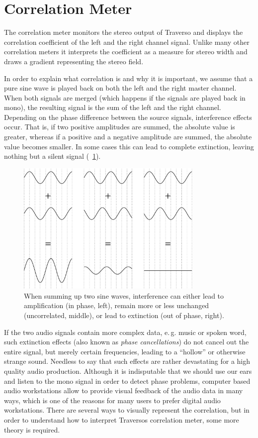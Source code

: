 \section{Correlation Meter}
The correlation meter monitors the stereo output of Traverso and displays the correlation coefficient of the left and the right channel signal. Unlike many other correlation meters it interprets the coefficient as a measure for stereo width and draws a gradient representing the stereo field.

In order to explain what correlation is and why it is important, we assume that a pure sine wave is played back on both the left and the right master channel. When both signals are merged (which happens if the signals are played back in mono), the resulting signal is the sum of the left and the right channel. Depending on the phase difference between the source signals, interference effects occur. That is, if two positive amplitudes are summed, the absolute value is greater, whereas if a positive and a negative amplitude are summed, the absolute value becomes smaller. In some cases this can lead to complete extinction, leaving nothing but a silent signal (\FigB\ \ref{fig_interference}).

\begin{figure}
	\centering\includegraphics[width=0.8\textwidth]{images/sine01}
	\caption{When summing up two sine waves, interference can either lead to amplification (in phase, left), remain more or less unchanged (uncorrelated, middle), or lead to extinction (out of phase, right).}
	\label{fig_interference}
\end{figure}

If the two audio signals contain more complex data, e.\,g. music or spoken word, such extinction effects (also known as \emph{phase cancellations}) do not cancel out the entire signal, but merely certain frequencies, leading to a ``hollow'' or otherwise strange sound. Needless to say that such effects are rather devastating for a high quality audio production. Although it is indisputable that we should use our ears and listen to the mono signal in order to detect phase problems, computer based audio workstations allow to provide visual feedback of the audio data in many ways, which is one of the reasons for many users to prefer digital audio workstations. There are several ways to visually represent the correlation, but in order to understand how to interpret Traversos correlation meter, some more theory is required.

